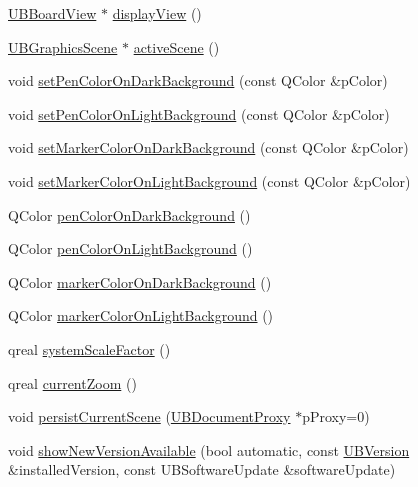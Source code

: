 \begin{DoxyCompactItemize}
\item 
\hyperlink{class_u_b_board_view}{U\-B\-Board\-View} $\ast$ \hyperlink{class_u_b_board_controller_a6c6255c94a1f826a5a23a4d5c68819ec}{display\-View} ()
\item 
\hyperlink{class_u_b_graphics_scene}{U\-B\-Graphics\-Scene} $\ast$ \hyperlink{class_u_b_board_controller_ad68061e07f0f3ad1d0299b09457db5fe}{active\-Scene} ()
\item 
void \hyperlink{class_u_b_board_controller_a1f23c4091945cbca291422280c7a4ae9}{set\-Pen\-Color\-On\-Dark\-Background} (const Q\-Color \&p\-Color)
\item 
void \hyperlink{class_u_b_board_controller_ae67dbddc09fe4103345391fadfc140f2}{set\-Pen\-Color\-On\-Light\-Background} (const Q\-Color \&p\-Color)
\item 
void \hyperlink{class_u_b_board_controller_a264406c94811826838a609521566a2f9}{set\-Marker\-Color\-On\-Dark\-Background} (const Q\-Color \&p\-Color)
\item 
void \hyperlink{class_u_b_board_controller_a95927bf1026ebbaf8c8c82b5abd252d3}{set\-Marker\-Color\-On\-Light\-Background} (const Q\-Color \&p\-Color)
\item 
Q\-Color \hyperlink{class_u_b_board_controller_a0b3be9ba94add4b515d0e65ca113f494}{pen\-Color\-On\-Dark\-Background} ()
\item 
Q\-Color \hyperlink{class_u_b_board_controller_a224eaea32f547c4cc802efffe22f1ec1}{pen\-Color\-On\-Light\-Background} ()
\item 
Q\-Color \hyperlink{class_u_b_board_controller_ac3931443ad31a01a8a1ef701746bb7cf}{marker\-Color\-On\-Dark\-Background} ()
\item 
Q\-Color \hyperlink{class_u_b_board_controller_a047505072685535f82ba22bb0cac4f51}{marker\-Color\-On\-Light\-Background} ()
\item 
qreal \hyperlink{class_u_b_board_controller_a6f46e3fe2ffde7ca74f50f175504c229}{system\-Scale\-Factor} ()
\item 
qreal \hyperlink{class_u_b_board_controller_acd5ef85a2562dd209581430f5e5231f2}{current\-Zoom} ()
\item 
void \hyperlink{class_u_b_board_controller_a12b23dc20db7b2e2014911c5785ba1bc}{persist\-Current\-Scene} (\hyperlink{class_u_b_document_proxy}{U\-B\-Document\-Proxy} $\ast$p\-Proxy=0)
\item 
void \hyperlink{class_u_b_board_controller_a0ae6fe2506cad8ba50128db6d1afe117}{show\-New\-Version\-Available} (bool automatic, const \hyperlink{class_u_b_version}{U\-B\-Version} \&installed\-Version, const U\-B\-Software\-Update \&software\-Update)

\end{DoxyCompactItemize}
